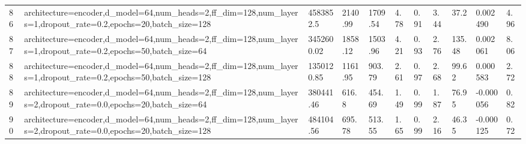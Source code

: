 \begin{longtable}{C{0.8cm} L{2cm} C{1.15cm} C{1.15cm} C{1.15cm} C{1.15cm} C{0.85cm} C{1.25cm} C{1.2cm} C{1.5cm} C{1.0cm}}
86 & architecture=encoder,\newline d\_model=64,\newline num\_heads=2,\newline ff\_dim=128,\newline num\_layers=1,\newline dropout\_rate=0.2,\newline epochs=20,\newline batch\_size=128 & 4583852.5 & 2140.99 & 1709.54 & 4.78 & 0.91 & 3.44 & 37.2 & 0.002490 & 4.96 \\
87 & architecture=encoder,\newline d\_model=64,\newline num\_heads=2,\newline ff\_dim=128,\newline num\_layers=1,\newline dropout\_rate=0.2,\newline epochs=50,\newline batch\_size=64 & 3452600.02 & 1858.12 & 1503.96 & 4.21 & 0.93 & 2.76 & 135.48 & 0.002061 & 8.06 \\
88 & architecture=encoder,\newline d\_model=64,\newline num\_heads=2,\newline ff\_dim=128,\newline num\_layers=1,\newline dropout\_rate=0.2,\newline epochs=50,\newline batch\_size=128 & 1350120.85 & 1161.95 & 903.79 & 2.61 & 0.97 & 2.68 & 99.62 & 0.000583 & 2.72 \\
89 & architecture=encoder,\newline d\_model=64,\newline num\_heads=2,\newline ff\_dim=128,\newline num\_layers=2,\newline dropout\_rate=0.0,\newline epochs=20,\newline batch\_size=64 & 380441.46 & 616.8 & 454.69 & 1.49 & 0.99 & 1.87 & 76.95 & -0.000056 & 0.82 \\
90 & architecture=encoder,\newline d\_model=64,\newline num\_heads=2,\newline ff\_dim=128,\newline num\_layers=2,\newline dropout\_rate=0.0,\newline epochs=20,\newline batch\_size=128 & 484104.56 & 695.78 & 513.55 & 1.65 & 0.99 & 2.16 & 46.35 & -0.000125 & 0.72 \\

\end{longtable}
